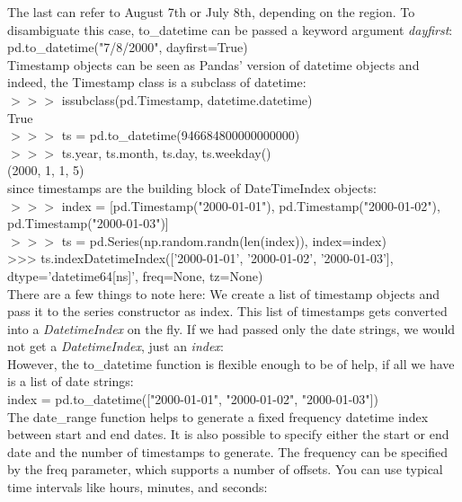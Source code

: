\documentclass{article}
\numberwithin{equation}{section} %
\begin{document}
The last can refer to August 7th or July 8th, depending on the region. To disambiguate this case, to\_datetime can be passed a keyword argument \textit{dayfirst}: \\

pd.to\_datetime("7/8/2000", dayfirst=True) \\

Timestamp objects can be seen as Pandas' version of datetime objects and indeed,
the Timestamp class is a subclass of datetime: \\

$>>>$ issubclass(pd.Timestamp, datetime.datetime) \\

True \\

$>>>$ ts = pd.to\_datetime(946684800000000000) \\

$>>>$ ts.year, ts.month, ts.day, ts.weekday() \\

(2000, 1, 1, 5) \\

since timestamps are the building block of DateTimeIndex objects: \\

$>>>$ index = [pd.Timestamp("2000-01-01"), pd.Timestamp("2000-01-02"), pd.Timestamp("2000-01-03")] \\
$>>>$ ts = pd.Series(np.random.randn(len(index)), index=index)\\

>>> ts.indexDatetimeIndex(['2000-01-01', '2000-01-02', '2000-01-03'],
dtype='datetime64[ns]', freq=None, tz=None) \\

There are a few things to note here: We create a list of timestamp objects and pass
it to the series constructor as index. This list of timestamps gets converted into a
\textit{DatetimeIndex} on the fly. If we had passed only the date strings, we would not get a \textit{DatetimeIndex}, just an \textit{index}: \\

However, the to\_datetime function is flexible enough to be of help, if all we have
is a list of date strings:\\

index = pd.to\_datetime(["2000-01-01", "2000-01-02", "2000-01-03"]) \\

The date\_range function helps to generate a fixed frequency datetime index
between start and end dates. It is also possible to specify either the start or end date and the number of timestamps to generate. The frequency can be specified by the freq parameter, which supports a number of offsets. You can use typical time intervals like hours, minutes, and seconds: \\
\end{document}
